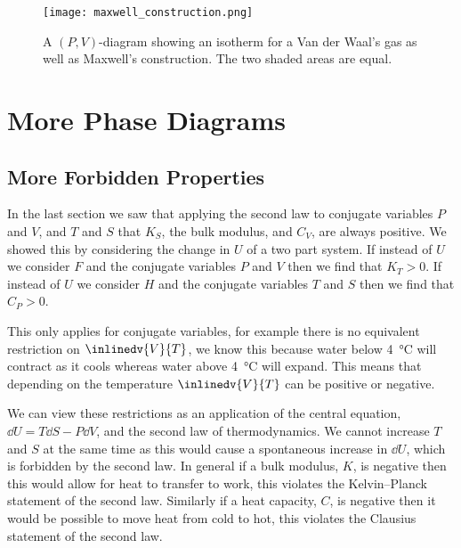    \begin{figure}[ht]
        \centering
        \texttt{[image: maxwell\_construction.png]}
        \caption{A \((P, V)\)-diagram showing an isotherm for a Van der Waal's gas as well as Maxwell's construction. The two shaded areas are equal.}
        \label{fig:maxwell's construction}
    \end{figure}

    \section{More Phase Diagrams}
    \subsection{More Forbidden Properties}
    In the last section we saw that applying the second law to conjugate variables \(P\) and \(V\), and \(T\) and \(S\) that \(K_S\), the bulk modulus, and \(C_V\), are always positive.
    We showed this by considering the change in \(U\) of a two part system.
    If instead of \(U\) we consider \(F\) and the conjugate variables \(P\) and \(V\) then we find that \(K_T > 0\).
    If instead of \(U\) we consider \(H\) and the conjugate variables \(T\) and \(S\) then we find that \(C_P > 0\).
    
    This only applies for conjugate variables, for example there is no equivalent restriction on \(\inlinedv{V}{T}\), we know this because water below \SI{4}{\degreeCelsius} will contract as it cools whereas water above \SI{4}{\degreeCelsius} will expand.
    This means that depending on the temperature \(\inlinedv{V}{T}\) can be positive or negative.
    
    We can view these restrictions as an application of the central equation, \(\dd{U} = T\dd{S} - P\dd{V}\), and the second law of thermodynamics.
    We cannot increase \(T\) and \(S\) at the same time as this would cause a spontaneous increase in \(\dd{U}\), which is forbidden by the second law.
    In general if a bulk modulus, \(K\), is negative then this would allow for heat to transfer to work, this violates the Kelvin--Planck statement of the second law.
    Similarly if a heat capacity, \(C\), is negative then it would be possible to move heat from cold to hot, this violates the Clausius statement of the second law.
    
